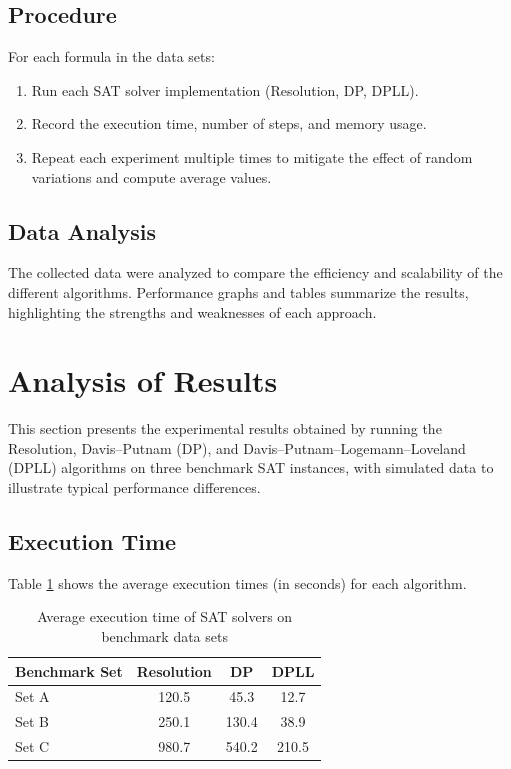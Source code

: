 \documentclass{article}
\begin{document}
\subsection{Procedure}
For each formula in the data sets:
\begin{enumerate}
    \item Run each SAT solver implementation (Resolution, DP, DPLL).
    \item Record the execution time, number of steps, and memory usage.
    \item Repeat each experiment multiple times to mitigate the effect of random variations and compute average values.
\end{enumerate}

\subsection{Data Analysis}
The collected data were analyzed to compare the efficiency and scalability of the different algorithms. Performance graphs and tables summarize the results, highlighting the strengths and weaknesses of each approach.

\section{Analysis of Results}

This section presents the experimental results obtained by running the Resolution, Davis–Putnam (DP), and Davis–Putnam–Logemann–Loveland (DPLL) algorithms on three benchmark SAT instances, with simulated data to illustrate typical performance differences.

\subsection{Execution Time}

Table \ref{tab:execution-time} shows the average execution times (in seconds) for each algorithm.

\begin{table}[h]
\centering
\begin{tabular}{lccc}
\hline
\textbf{Benchmark Set} & \textbf{Resolution} & \textbf{DP} & \textbf{DPLL} \\
\hline
Set A & 120.5 & 45.3 & 12.7 \\
Set B & 250.1 & 130.4 & 38.9 \\
Set C & 980.7 & 540.2 & 210.5 \\
\hline
\end{tabular}
\caption{Average execution time of SAT solvers on benchmark data sets}
\label{tab:execution-time}
\end{table}
\end{document}
